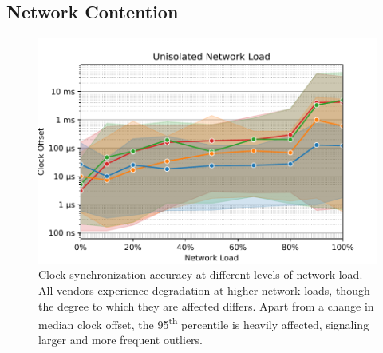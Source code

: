 \subsection{Network Contention}
\begin{figure}
    \centering
    \includegraphics[width=\linewidth]{res/generated/net_unprioritized_trend_rpi-4.pdf}
    \legend
    \caption{Clock synchronization accuracy at different levels of network load. All vendors experience degradation at higher network loads, though the degree to which they are affected differs. Apart from a change in median clock offset, the 95\textsuperscript{th} percentile is heavily affected, signaling larger and more frequent outliers.}
    \label{fig:network_load}
\end{figure}


